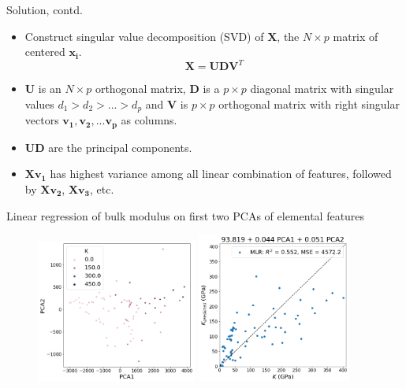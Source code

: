 \documentclass[aspectratio=169]{beamer}
\let \vec \mathbf
\begin{document}
\begin{frame}{Solution, contd.}
    \begin{itemize}
        \item Construct singular value decomposition (SVD) of $\vec{X}$, the $N \times p$ matrix of centered $\vec{x_i}$.
        \begin{equation*}
            \vec{X} = \vec{U}\vec{D}\vec{V}^T
        \end{equation*}
        \item $\vec{U}$ is an $N \times p$ orthogonal matrix, $\vec{D}$ is a $p\times p $ diagonal matrix with singular values $d_1 > d_2 > ... > d_p$ and $\vec{V}$ is $p \times p$ orthogonal matrix with right singular vectors $\vec{v_1}, \vec{v_2}, ...\vec{v_p}$ as columns.
        \item $\vec{UD}$ are the principal components. 
        \item $\vec{Xv_1}$ has highest variance among all linear combination of features, followed by $\vec{Xv_2}$, $\vec{Xv_3}$, etc.
    \end{itemize}
\end{frame} 


\begin{frame}{Linear regression of bulk modulus on first two PCAs of elemental features}
\begin{figure}
    \centering
    \includegraphics[width=0.47\textwidth]{figures/pca-elements.png}
    \includegraphics[width=0.45\textwidth]{figures/pca-regression.png}
\end{figure}
\end{frame} 
\end{document}
